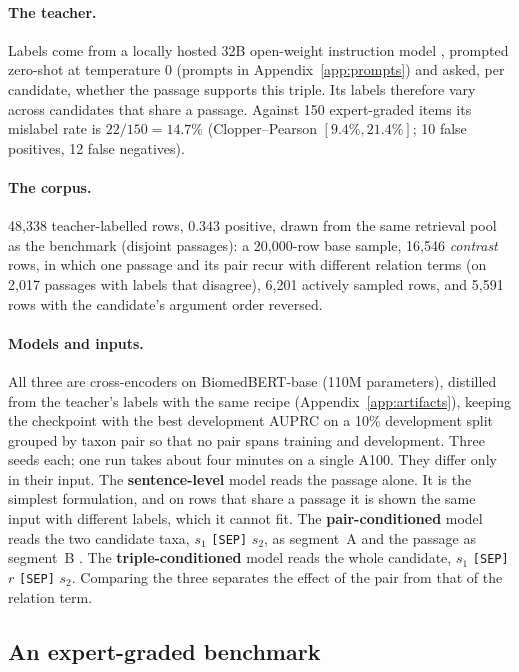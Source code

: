 \documentclass[11pt]{article}
\begin{document}
\paragraph{The teacher.}
Labels come from a locally hosted 32B open-weight instruction model \citep{qwen2025technical},
prompted zero-shot at temperature 0 (prompts in Appendix~\ref{app:prompts}) and asked, per
candidate, whether the passage supports this triple. Its labels therefore vary across
candidates that share a passage. Against 150 expert-graded items its mislabel rate is
$22/150 = 14.7\%$ (Clopper--Pearson $[9.4\%, 21.4\%]$; 10 false positives, 12 false negatives).

\paragraph{The corpus.}
48{,}338 teacher-labelled rows, $0.343$ positive, drawn from the same retrieval pool as the benchmark
(disjoint passages): a 20{,}000-row base sample, 16{,}546 \emph{contrast} rows, in which one passage
and its pair recur with different relation terms (on 2{,}017 passages with labels that disagree),
6{,}201 actively sampled rows, and 5{,}591 rows with the candidate's argument order reversed.

\paragraph{Models and inputs.}
All three are cross-encoders on BiomedBERT-base \citep{gu2021domain} (110M parameters), distilled
from the teacher's labels \citep{bucilua2006model,hinton2015distilling} with the same recipe
(Appendix~\ref{app:artifacts}), keeping the checkpoint with the best development AUPRC on a 10\%
development split grouped by taxon pair so that no pair spans training and development. Three seeds
each; one run takes about four minutes on a single A100. They differ only in their input.
The \textbf{sentence-level} model reads the passage alone. It is the simplest formulation, and on rows that share a passage it is shown the same input with different
labels, which it cannot fit. The \textbf{pair-conditioned} model reads the two candidate taxa,
$s_1$ \texttt{[SEP]} $s_2$, as segment~A and the passage as segment~B
\citep{nogueira2019passage}. The \textbf{triple-conditioned} model reads the whole candidate,
$s_1$ \texttt{[SEP]} $r$ \texttt{[SEP]} $s_2$. Comparing the three separates the effect of the pair from that of the relation term.

\subsection{An expert-graded benchmark}
\label{sec:benchmark}
\end{document}
